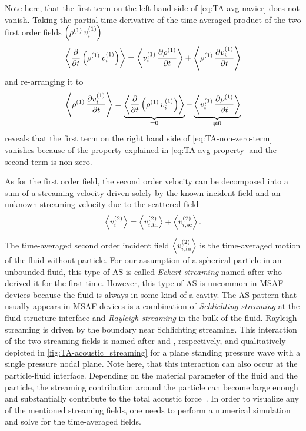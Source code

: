 Note here, that the first term on the left hand side of \cref{eq:TA-avg-navier} 
does not vanish. Taking the partial time derivative of the time-averaged 
product of the two first order fields 
$\left(\rho^{(1)}\,v_{i}^{(1)}\right)$
\begin{equation}
  \left\langle \pdv{t}\left( \rho^{(1)}\,v_{i}^{(1)} \right) \right\rangle
  =
  \left\langle v_{i}^{(1)}\,\pdv{  \rho^{(1)}  }{t} \right\rangle
  +
  \left\langle \rho^{(1)}\,\pdv{  v_{i}^{(1)}  }{t} \right\rangle
\end{equation}
and re-arranging it to
\begin{equation}
  \left\langle \rho^{(1)}\,\pdv{  v_{i}^{(1)}  }{t} \right\rangle
  =
  \underbrace{
  \left\langle \pdv{t}\left( \rho^{(1)}\,v_{i}^{(1)} \right) \right\rangle
}_{=0}
  -
  \underbrace{
  \left\langle v_{i}^{(1)}\,\pdv{  \rho^{(1)}  }{t} \right\rangle
}_{\neq 0}
  \label{eq:TA-non-zero-term}
\end{equation}
reveals that the first term on the right hand side of 
\cref{eq:TA-non-zero-term} vanishes because of the property explained in 
\cref{eq:TA-avg-property} and the second term is non-zero.

As for the first order field, the second order velocity can be decomposed into 
a sum of a streaming velocity driven solely by the known incident field and an 
unknown streaming velocity due to the scattered field
\begin{equation}
  \left\langle v_{i}^{(2)} \right\rangle =
    \left\langle v_{i,\mathrm{in}}^{(2)} \right\rangle +
    \left\langle v_{i,\mathrm{sc}}^{(2)} \right\rangle.
  \label{eq:TA-nd-velocity}
\end{equation}

The time-averaged second order incident field 
$\left\langle v_{i,\mathrm{in}}^{(2)} \right\rangle$ is the time-averaged motion of the 
fluid without particle. For our assumption of a spherical particle in an 
unbounded fluid, this type of AS is called \emph{Eckart streaming} named after 
 who derived it for the first time. However, this type of AS 
is uncommon in MSAF devices because the fluid is always in some kind of a 
cavity. The AS pattern that usually appears in MSAF devices is a combination of 
\emph{Schlichting streaming} at the fluid-structure interface and 
\emph{Rayleigh streaming} in the bulk of the fluid. Rayleigh streaming is 
driven by the boundary near Schlichting streaming. This interaction of the two 
streaming fields is named after  and 
, respectively, and qualitatively depicted in 
\cref{fig:TA-acoustic_streaming} for a plane standing pressure wave with a 
single pressure nodal plane. Note here, that this interaction can also occur at 
the particle-fluid interface. Depending on the material parameter of the fluid 
and the particle, the streaming contribution around the particle can become 
large enough and substantially contribute to the total acoustic 
force~\cite{Baasch2019}. In order to visualize any of the mentioned streaming 
fields, one needs to perform a numerical simulation and solve for the 
time-averaged fields.


